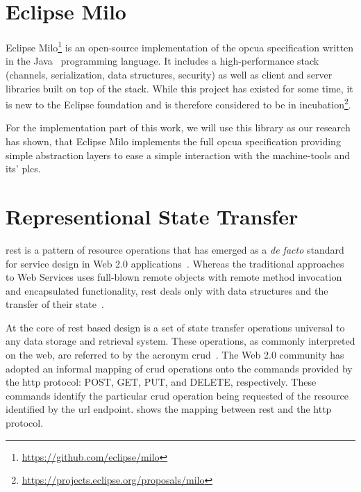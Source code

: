 \documentclass[
a4paper,
twoside,
headsepline,
cleardoublepage=empty,
parskip=half,
draft=false
]{scrbook}
\begin{document}
		\section{Eclipse Milo}\label{sec:eclipse_milo}

			Eclipse Milo\footnote{\url{https://github.com/eclipse/milo}} is an open-source implementation of the \gls{opcua} specification written in the Java~\cite{java2015} programming language. 
			It includes a high-performance stack (channels, serialization, data structures, security) as well as client and server libraries built on top of the stack.
			While this project has existed for some time, it is new to the Eclipse foundation and is therefore considered to be in incubation\footnote{\url{https://projects.eclipse.org/proposals/milo}}.
			
			For the implementation part of this work, we will use this library as our research has shown, that Eclipse Milo implements the full \gls{opcua} specification providing simple abstraction layers to ease a simple interaction with the machine-tools and its' \gls{plc}s.

		\section{Representional State Transfer}\label{sec:rest}

			\gls{rest} is a pattern of resource operations that has emerged as a \textit{de facto} standard for service design in Web 2.0 applications~\cite{battle2008bridging}. Whereas the traditional approaches to Web Services uses full-blown remote objects with remote method invocation and encapsulated functionality, \gls{rest} deals only with data structures and the transfer of their state~\cite{fielding2000architectural}.
			
			At the core of \gls{rest} based design is a set of state transfer operations universal to any data storage and retrieval system.
			These operations, as commonly interpreted on the web, are referred to by the acronym \gls{crud}~\cite{battle2008bridging}.
			The Web 2.0 community has adopted an informal mapping of \gls{crud} operations onto the commands provided by the \gls{http} protocol: POST, GET, PUT, and DELETE, respectively. 
			These commands identify the particular \gls{crud} operation being requested of the resource identified by the \gls{url} endpoint.
			 shows the mapping between \gls{rest} and the \gls{http} protocol.
			
\end{document}
